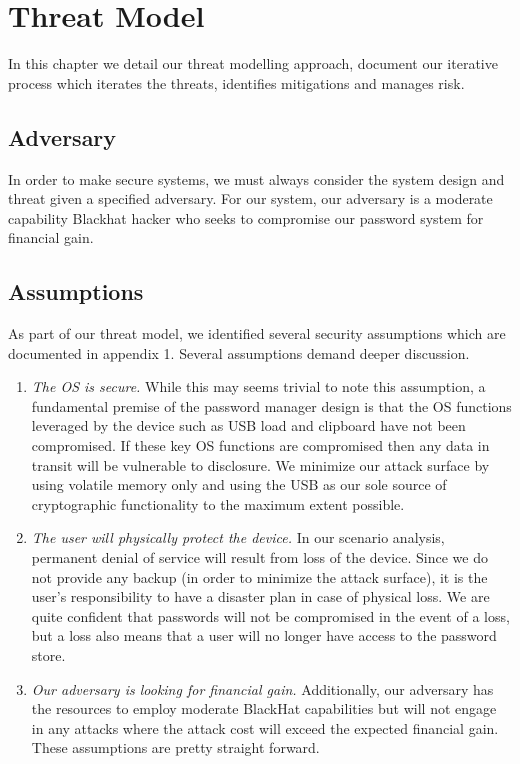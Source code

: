 \chapter{Threat Model}
\label{ch:threatmodel}
In this chapter we detail our threat modelling approach, document our iterative
process which iterates the threats, identifies mitigations and manages risk.


\section{Adversary}
\label{sec:adversary}
In order to make secure systems, we must always consider the system design and
threat given a specified adversary.  For our system, our adversary is a moderate
capability Blackhat hacker who seeks to compromise our password system for
financial gain.

\section{Assumptions}
\label{sec:assumptions}
As part of our threat model, we identified several security assumptions which
are documented in appendix 1.  Several assumptions demand deeper discussion.
\begin{enumerate}
    \item{\emph{The OS is secure.} While this may seems trivial to note this
assumption, a fundamental premise of the password manager design is that the OS
functions leveraged by the device such as USB load and clipboard have not been
compromised.  If these key OS functions are compromised then any data in transit
will be vulnerable to disclosure.  We minimize our attack surface by using
volatile memory only and using the USB as our sole source of cryptographic
functionality to the maximum extent possible.}
    \item{\emph{The user will physically protect the device.} In our scenario
analysis, permanent denial of service will result from loss of the device.
Since we do not provide any backup (in order to minimize the attack surface), it
is the user's responsibility to have a disaster plan in case of physical loss.
We are quite confident that passwords will not be compromised in the event of a
loss, but a loss also means that a user will no longer have access to the
password store.}
    \item{\emph{Our adversary is looking for financial gain.} Additionally, our
adversary has the resources to employ moderate BlackHat capabilities but will
not engage in any attacks where the attack cost will exceed the expected
financial gain.}  These assumptions are pretty
straight forward.
\end{enumerate}


